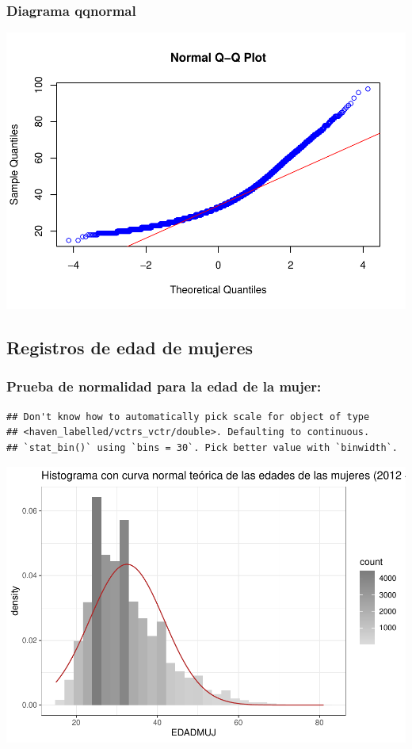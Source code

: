 \documentclass[
]{article}
\begin{document}
\hypertarget{diagrama-qqnormal}{%
\subsubsection{Diagrama qqnormal}\label{diagrama-qqnormal}}

\includegraphics{Proyecto_files/figure-latex/normalQQEdadHombre-1.pdf}

\hypertarget{registros-de-edad-de-mujeres}{%
\subsection{Registros de edad de
mujeres}\label{registros-de-edad-de-mujeres}}

\hypertarget{prueba-de-normalidad-para-la-edad-de-la-mujer}{%
\subsubsection{Prueba de normalidad para la edad de la
mujer:}\label{prueba-de-normalidad-para-la-edad-de-la-mujer}}

\begin{verbatim}
## Don't know how to automatically pick scale for object of type
## <haven_labelled/vctrs_vctr/double>. Defaulting to continuous.
## `stat_bin()` using `bins = 30`. Pick better value with `binwidth`.
\end{verbatim}

\includegraphics{Proyecto_files/figure-latex/normalHistEdadMuje-1.pdf}
\end{document}
